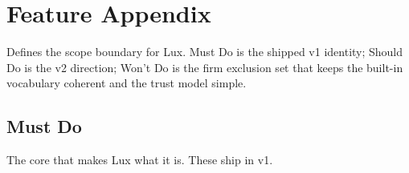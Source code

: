 \documentclass[11pt,letterpaper]{article}
\begin{document}

\newpage
\section*{Feature Appendix}

Defines the scope boundary for Lux. Must Do is the shipped v1 identity; Should
Do is the v2 direction; Won't Do is the firm exclusion set that keeps the
built-in vocabulary coherent and the trust model simple.

\subsection*{Must Do}

The core that makes Lux what it is. These ship in v1.
\end{document}
